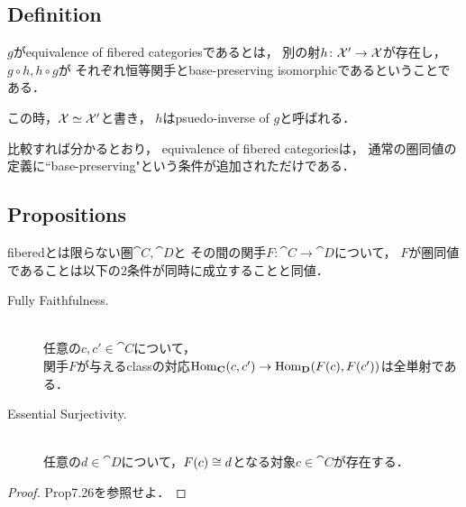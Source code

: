 \subsection{Definition}
    \begin{Def}[Equivalence]
        $g$がequivalence of fibered categoriesであるとは，
        別の射$h \colon \mathcal{X}' \to \mathcal{X}$が存在し，
        $g \circ h, h \circ g$が
        それぞれ恒等関手とbase-preserving isomorphicであるということである．

        この時，$\mathcal{X} \simeq \mathcal{X}'$と書き，
        $h$はpsuedo-inverse of $g$と呼ばれる．
    \end{Def}
    \begin{Remark}
        比較すれば分かるとおり，
        equivalence of fibered categoriesは，
        通常の圏同値の定義に``base-preserving"という条件が追加されただけである．
    \end{Remark}

\subsection{Propositions}
    \begin{Prop}
        fiberedとは限らない圏$\cat{C}, \cat{D}$と
        その間の関手$F \colon \cat{C} \to \cat{D}$について，
        $F$が圏同値であることは以下の$2$条件が同時に成立することと同値．
        \begin{description}
            \item[Fully Faithfulness.] \mbox{}\\
                任意の$c,c' \in \cat{C}$について，\mbox{}\\
                関手$F$が与えるclassの対応$\operatorname{Hom}_{\mathbf{C}}(c, c') \to \operatorname{Hom}_{\mathbf{D}}(F(c), F(c'))$は全単射である．

            \item[Essential Surjectivity.] \mbox{}\\
                任意の$d \in \cat{D}$について，$F(c) \cong d$となる対象$c \in \cat{C}$が存在する．
        \end{description}
    \end{Prop}
    \begin{proof}
        \cite{Awodey10} Prop7.26を参照せよ．
    \end{proof}

